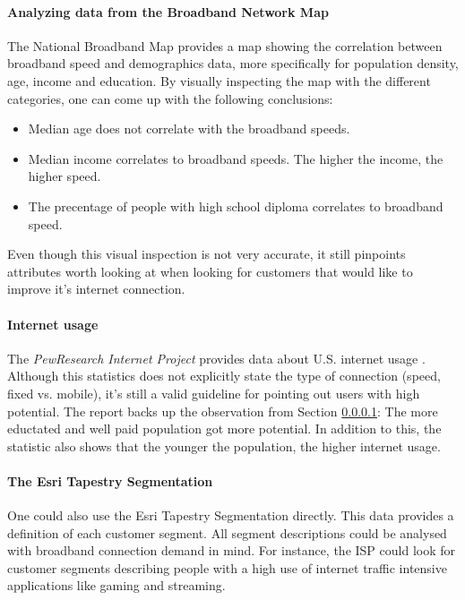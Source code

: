 \documentclass[twocolumn]{article}
\begin{document}
\paragraph{Analyzing data from the Broadband Network Map}
\label{sub:Analyzing data from the Broadband Network Map}
The National Broadband Map provides a map showing the correlation between broadband speed and demographics data, more specifically for population density, age, income and education. By visually inspecting the map with the different categories, one can come up with the following conclusions:
\begin{itemize}
  \item Median age does not correlate with the broadband speeds. 
  \item Median income correlates to broadband speeds. The higher the income, the higher speed.
  \item The precentage of people with high school diploma correlates to broadband speed.
\end{itemize}
Even though this visual inspection is not very accurate, it still pinpoints attributes worth looking at when looking for customers that would like to improve it's internet connection.

\paragraph{Internet usage}
\label{sub:Internet usage}
The \textit{PewResearch Internet Project} provides data about U.S. internet usage \cite{noauthor_2013-ev}. Although this statistics does not explicitly state the type of connection (speed, fixed vs. mobile), it's still a valid guideline for pointing out users with high potential. The report backs up the observation from Section \ref{sub:Analyzing data from the Broadband Network Map}: The more eductated and well paid population got more potential. In addition to this, the statistic also shows that the younger the population, the higher internet usage.

\paragraph{The Esri Tapestry Segmentation}
\label{sub:The Esri Tapestry Segmentation}
One could also use the Esri Tapestry Segmentation directly. This data provides a definition of each customer segment. All segment descriptions could be analysed with broadband connection demand in mind. For instance, the ISP could look for customer segments describing people with a high use of internet traffic intensive applications like gaming and streaming.
\end{document}
